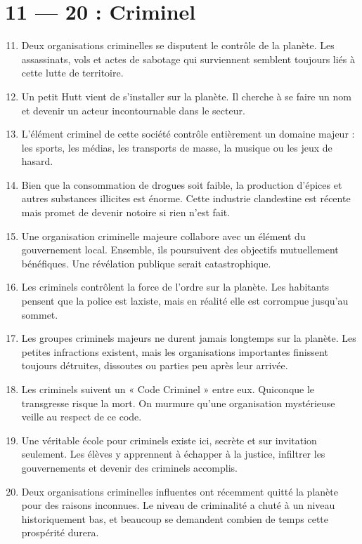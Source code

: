 \documentclass{article}
\begin{document}
\section*{11 --- 20 : Criminel}
\begin{enumerate}
	\setcounter{enumi}{10}
	\item Deux organisations criminelles se disputent le contrôle de la planète. Les assassinats, vols et actes de sabotage qui surviennent semblent toujours liés à cette lutte de territoire.
	\item Un petit Hutt vient de s’installer sur la planète. Il cherche à se faire un nom et devenir un acteur incontournable dans le secteur.
	\item L’élément criminel de cette société contrôle entièrement un domaine majeur : les sports, les médias, les transports de masse, la musique ou les jeux de hasard.
	\item Bien que la consommation de drogues soit faible, la production d’épices et autres substances illicites est énorme. Cette industrie clandestine est récente mais promet de devenir notoire si rien n’est fait.
	\item Une organisation criminelle majeure collabore avec un élément du gouvernement local. Ensemble, ils poursuivent des objectifs mutuellement bénéfiques. Une révélation publique serait catastrophique.
	\item Les criminels contrôlent la force de l’ordre sur la planète. Les habitants pensent que la police est laxiste, mais en réalité elle est corrompue jusqu’au sommet.
	\item Les groupes criminels majeurs ne durent jamais longtemps sur la planète. Les petites infractions existent, mais les organisations importantes finissent toujours détruites, dissoutes ou parties peu après leur arrivée.
	\item Les criminels suivent un « Code Criminel » entre eux. Quiconque le transgresse risque la mort. On murmure qu’une organisation mystérieuse veille au respect de ce code.
	\item Une véritable école pour criminels existe ici, secrète et sur invitation seulement. Les élèves y apprennent à échapper à la justice, infiltrer les gouvernements et devenir des criminels accomplis.
	\item Deux organisations criminelles influentes ont récemment quitté la planète pour des raisons inconnues. Le niveau de criminalité a chuté à un niveau historiquement bas, et beaucoup se demandent combien de temps cette prospérité durera.
\end{enumerate}
\end{document}
